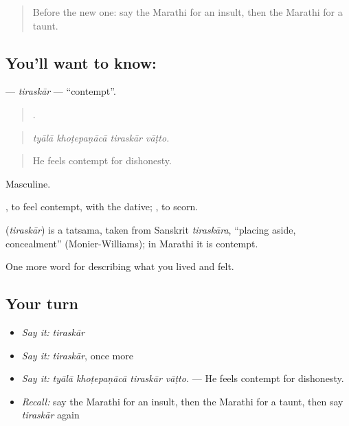 \label{lesson:MR-C461-tiraskar}



\begin{quote}
Before the new one: say the Marathi for an insult, then the Marathi for a taunt.
\end{quote}

\subsection*{You'll want to know: }
\textbf{} — \emph{tiraskār} — \textquotedblleft{}contempt\textquotedblright{}.

\begin{quote}
   .
\end{quote}

\begin{quote}
\emph{tyālā khoṭepaṇācā tiraskār vāṭto.}
\end{quote}

\begin{quote}
He feels contempt for dishonesty.
\end{quote}

Masculine.

 , to feel contempt, with the dative;  , to scorn.

\begin{cousinweb}
\textbf{} (\emph{tiraskār}) is a tatsama, taken from Sanskrit \emph{tiraskāra}, \textquotedblleft{}placing aside, concealment\textquotedblright{} (Monier-Williams); in Marathi it is contempt.
\end{cousinweb}

\begin{grammarlens}[title={What you've built}]
One more word for describing what you lived and felt.
\end{grammarlens}

\subsection*{Your turn}
\begin{itemize}
\raggedright
  \item \emph{Say it:} \emph{tiraskār}
  \item \emph{Say it:} \emph{tiraskār}, once more
  \item \emph{Say it:} \emph{tyālā khoṭepaṇācā tiraskār vāṭto.} — He feels contempt for dishonesty.
  \item \emph{Recall:} say the Marathi for an insult, then the Marathi for a taunt, then say \emph{tiraskār} again
\end{itemize}


